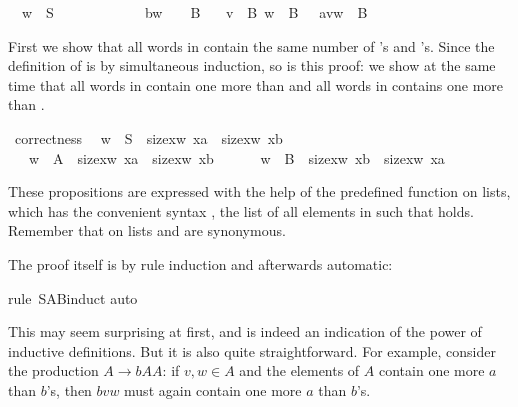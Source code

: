 \begin{isabellebody}
\isanewline
\ \ {\isachardoublequote}w\ {\isasymin}\ S\ \ \ \ \ \ \ \ \ \ \ \ {\isasymLongrightarrow}\ b{\isacharhash}w\ \ \ {\isasymin}\ B{\isachardoublequote}\isanewline
\ \ {\isachardoublequote}{\isasymlbrakk}\ v\ {\isasymin}\ B{\isacharsemicolon}\ w\ {\isasymin}\ B\ {\isasymrbrakk}\ {\isasymLongrightarrow}\ a{\isacharhash}v{\isacharat}w\ {\isasymin}\ B{\isachardoublequote}%
\begin{isamarkuptext}%
\noindent
First we show that all words in  contain the same number of 's and 's. Since the definition of  is by simultaneous
induction, so is this proof: we show at the same time that all words in
 contain one more  than  and all words in  contains one more  than .%
\end{isamarkuptext}%
\ correctness{\isacharcolon}\isanewline
\ \ {\isachardoublequote}{\isacharparenleft}w\ {\isasymin}\ S\ {\isasymlongrightarrow}\ size{\isacharbrackleft}x{\isasymin}w{\isachardot}\ x{\isacharequal}a{\isacharbrackright}\ {\isacharequal}\ size{\isacharbrackleft}x{\isasymin}w{\isachardot}\ x{\isacharequal}b{\isacharbrackright}{\isacharparenright}\ \ \ \ \ {\isasymand}\isanewline
\ \ \ {\isacharparenleft}w\ {\isasymin}\ A\ {\isasymlongrightarrow}\ size{\isacharbrackleft}x{\isasymin}w{\isachardot}\ x{\isacharequal}a{\isacharbrackright}\ {\isacharequal}\ size{\isacharbrackleft}x{\isasymin}w{\isachardot}\ x{\isacharequal}b{\isacharbrackright}\ {\isacharplus}\ {}{\isacharparenright}\ {\isasymand}\isanewline
\ \ \ {\isacharparenleft}w\ {\isasymin}\ B\ {\isasymlongrightarrow}\ size{\isacharbrackleft}x{\isasymin}w{\isachardot}\ x{\isacharequal}b{\isacharbrackright}\ {\isacharequal}\ size{\isacharbrackleft}x{\isasymin}w{\isachardot}\ x{\isacharequal}a{\isacharbrackright}\ {\isacharplus}\ {}{\isacharparenright}{\isachardoublequote}%
\begin{isamarkuptxt}%
\noindent
These propositions are expressed with the help of the predefined  function on lists, which has the convenient syntax , the list of all elements  in  such that 
holds. Remember that on lists  and  are synonymous.

The proof itself is by rule induction and afterwards automatic:%
\end{isamarkuptxt}%
rule\ S{\isacharunderscore}A{\isacharunderscore}B{\isachardot}induct{\isacharparenright}\isanewline
{}auto{\isacharparenright}%
\begin{isamarkuptext}%
\noindent
This may seem surprising at first, and is indeed an indication of the power
of inductive definitions. But it is also quite straightforward. For example,
consider the production $A \to b A A$: if $v,w \in A$ and the elements of $A$
contain one more $a$ than $b$'s, then $bvw$ must again contain one more $a$
than $b$'s.


\end{isamarkuptext}
\end{isabellebody}
